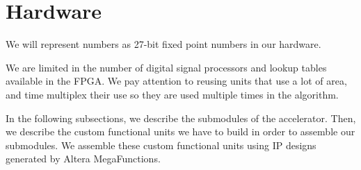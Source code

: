\section{Hardware}

We will represent numbers as 27-bit fixed point numbers in our hardware.

We are limited in the number of digital signal processors and lookup tables available in the FPGA. We pay attention to reusing units that use a lot of area, and time multiplex their use so they are used multiple times in the algorithm.

In the following subsections, we describe the submodules of the accelerator. Then, we describe the custom functional units we have to build in order to assemble our submodules. We assemble these custom functional units using IP designs generated by Altera MegaFunctions.





